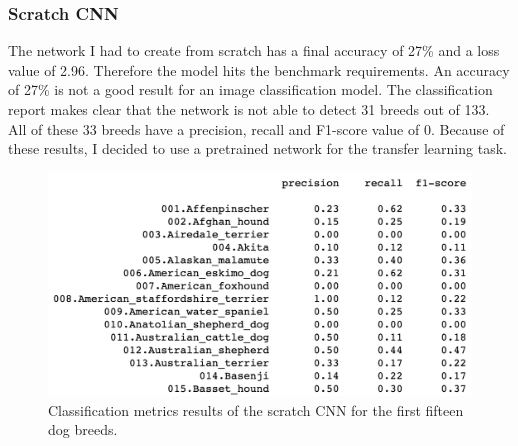 \documentclass{article}
\begin{document}
\subsubsection{Scratch CNN}
The network I had to create from scratch has a final accuracy of 27\% and a loss value of 2.96. Therefore the model hits the benchmark requirements.\newline
An accuracy of 27\% is not a good result for an image classification model. The classification report makes clear that the network is not able to detect 31 breeds out of 133. All of these 33 breeds have a precision, recall and F1-score value of 0. Because of these results, I decided to use a pretrained network for the transfer learning task.
\begin{figure}[h]
    \centering
    \includegraphics[scale=0.45]{./images/scratch_classification_report}
    \caption{Classification metrics results of the scratch CNN for the first fifteen dog breeds.}
    \label{fig:scratch_cnn_class_rep}
\end{figure}
\end{document}

